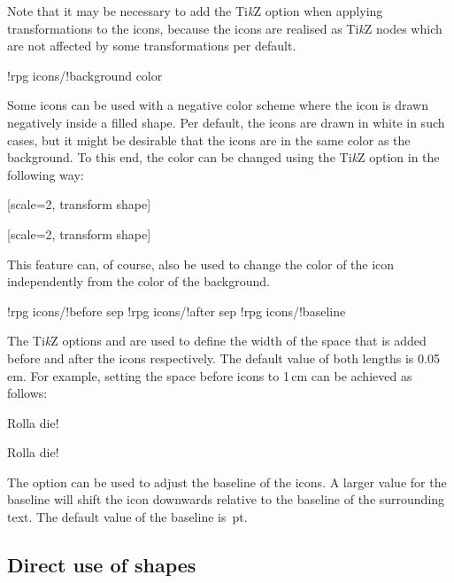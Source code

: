 \documentclass[a4paper]{article}
\begin{document}
Note that it may be necessary to add the Ti\emph{k}Z option  when applying transformations to the icons, because the icons are realised as Ti\emph{k}Z nodes which are not affected by some transformations per default.

\begin{macrodef}!rpg icons/!background color\end{macrodef}
Some icons can be used with a negative color scheme where the icon is drawn negatively inside a filled shape. Per default, the icons are drawn in white in such cases, but it might be desirable that the icons are in the same color as the background. To this end, the color can be changed using the Ti\emph{k}Z option  in the following way:

\begin{codeexample}
\colorbox{blue!50}{%
        [scale=2, transform shape]%
}

\colorbox{blue!50}{%
        [scale=2, transform shape]%
}
\end{codeexample}
This feature can, of course, also be used to change the color of the icon independently from the color of the background.

\begin{macrodef}
!rpg icons/!before sep
!rpg icons/!after sep
!rpg icons/!baseline
\end{macrodef}
The Ti\emph{k}Z options  and  are used to define the width of the space that is added before and after the icons respectively. The default value of both lengths is 0.05\,em. For example, setting the space before icons to 1\,cm can be achieved as follows:

\begin{codeexample}
Rolla die!

Rolla die!
\end{codeexample}

The option  can be used to adjust the baseline of the icons. A larger value for the baseline will shift the icon downwards relative to the baseline of the surrounding text. The default value of the baseline is \,pt.

\subsection{Direct use of shapes}
\end{document}
